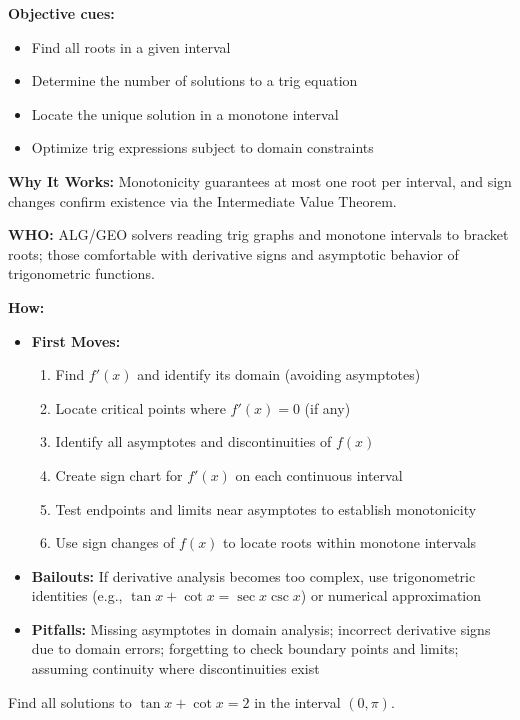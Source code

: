\documentclass[12pt]{article}
\newenvironment{problem}[1]
{\begin{tcolorbox}[colback=blue!5!white,colframe=blue!75!black,title={#1}]}{\end{tcolorbox}}
\begin{document}
\textbf{Objective cues:}
\begin{itemize}
    \item Find all roots in a given interval
    \item Determine the number of solutions to a trig equation
    \item Locate the unique solution in a monotone interval
    \item Optimize trig expressions subject to domain constraints
\end{itemize}

\textbf{Why It Works:} Monotonicity guarantees at most one root per interval, and sign changes confirm existence via the Intermediate Value Theorem.

\textbf{WHO:} ALG/GEO solvers reading trig graphs and monotone intervals to bracket roots; those comfortable with derivative signs and asymptotic behavior of trigonometric functions.

\textbf{How:}
\begin{itemize}
    \item \textbf{First Moves:} 
    \begin{enumerate}[nosep]
        \item Find $f'(x)$ and identify its domain (avoiding asymptotes)
        \item Locate critical points where $f'(x) = 0$ (if any)
        \item Identify all asymptotes and discontinuities of $f(x)$
        \item Create sign chart for $f'(x)$ on each continuous interval
        \item Test endpoints and limits near asymptotes to establish monotonicity
        \item Use sign changes of $f(x)$ to locate roots within monotone intervals
    \end{enumerate}
    \item \textbf{Bailouts:} If derivative analysis becomes too complex, use trigonometric identities (e.g., $\tan x + \cot x = \sec x \csc x$) or numerical approximation
    \item \textbf{Pitfalls:} Missing asymptotes in domain analysis; incorrect derivative signs due to domain errors; forgetting to check boundary points and limits; assuming continuity where discontinuities exist
\end{itemize}

\begin{problem}{Example: Trigonometric Monotone Scanning}
Find all solutions to $\tan x + \cot x = 2$ in the interval $(0, \pi)$.
\end{problem}
\end{document}
